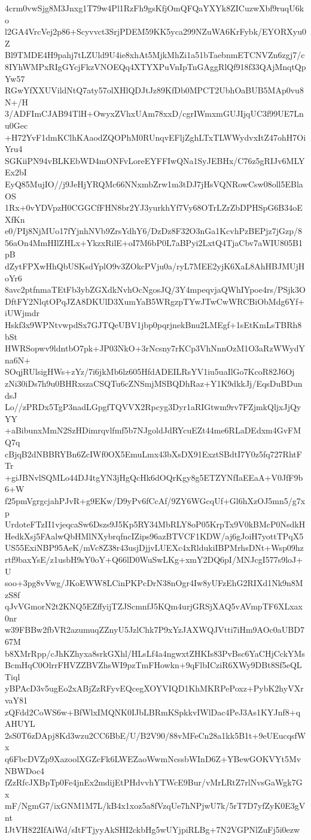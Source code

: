 4crm0vwSjg8M3Jnxg1T79w4Pl1RzFh9gsKfjOmQFQaYXYk8ZICuzwXbf9ruqU6ko
l2GA4VrcVej2p86+Scyvvct3SrjPDEM59KK5yca299NZuWA6KrFybk/EYORXyu0Z
Bl9TMDE4H9pahj7tLZUld9U4ie8xhAt5MjkMhZi1a51bTaebnmETCNVZn6zgj7/c
8IYhWMPxRIgGYcjFkzVNOEQq4XTYXPuVnIpTnGAggRlQf918f33QAjMnqtQpYw57
RGwYfXXUVildNtQ7aty57olXHlQDJtJz89KfDb0MPCT2UbhOaBUB5MAp0vu8N+/H
3/ADFImCJAB94TlH+OwyxZVhxUAm78xxD/cgrIWmxmGUJIjqUC3f99UE7Lnu0Gec
+H72YvF1dmKClhKAaodZQOPhM0RUnqvEFljZghLTxTLWWydvxItZ47ohH7OiYru4
SGKiiPN94vBLKEbWD4mONFvLoreEYFFIwQNa1SyJEBHx/C76z5gRIJv6MLYEx2bI
EyQ85MujIO//j9JeHjYRQMc66NNxmbZrw1m3tDJ7jHsVQNRowCsw08oll5EBlaOS
1Rx+0vYDVpzH0CGGCfFHN8br2YJ3yurkhYf7Vy68OTrLZrZbDPHSpG6B34oEXfKn
e0/PIj8NjMUo17fYjnhNVb9ZrsYdhY6/DzDz8F32O3nGa1KcvhPzBEPjz7jGzp/8
56aOn4MmHIlZHLx+YkzxRilE+oI7M6bP0L7aBPyi2LxtQ4TjaCbv7aWIU805B1pB
dZytFPXwHhQbUSKsdYplO9v3ZOkcPVju0a/ryL7MEE2yjK6XaL8AhHBJMUjHoYr6
8avc2ptfnmaTEtFb3ybZGXdkNvhOcNgosJQ/3Y4mpeqvjaQWhIYpoe4rs/PSjk3O
DftFY2NlqtOPqJZA8DKUlD3XumYaB5WRgzpTYwJTwCwWRCBiObMdg6Yf+iUWjmdr
Hskf3x9WPNtvwpdSx7GJTQeUBV1jbp0pqrjnekBnu2LMEgf+1sEtKmLsTBRh8bSt
HWRSopwv9ldntbO7pk+JP03NkO+3rNcsny7rKCp3VhNnnOzM1O3aRzWWydYna6N+
SOqjRUlsigHWs+zYz/7i6jkMb6lz605HfdADEILRsYV1iu5uaIlGo7KcoR82J6Oj
zNi30iDs7h9u0BHRxszaCSQTu6cZNSmjMSBQDhRaz+Y1K9dkkJj/EqsDuBDundsJ
Lo//zPRDx5TgP3nadLGpgfTQVVX2Rpcyg3Dyr1aRIGtwm9rv7FZjmkQljxJjQyYY
+aBibunxMmN2SzHDimrqvlfmf5b7NJgoldJdRYcuEZt44me6RLaDEdxm4GvFMQ7q
cBjqB2dNBBRYBn6ZcIWf0OX5EmuLmx43bXsDX91ExztSBdtI7Y0z5fq727RhtFTr
+giJBNvlSQMLo44DJ4tgYN3jHgQcHk6dOQrKgy8g5ETZYNfIaEEaA+V0JfF9b6+W
f25pmVgrgcjahPJvR+g9EKw/D9yPv6fCcAf/9ZY6WGcqUf+Gl6hXzOJ5mn5/g7xp
UrdoteFTzII1vjeqcaSw6Dszs9J5Kp5RY34MbRLY8oP05KrpTx9V0kBMcP0NsdkH
HedkXsj5FAalwQbHMlNXybrqfncIZips96azBTVCF1KDW/aj6gJoiH7yottTPqX5
US55ExiNBP95AeK/mVc8Z38r43usjDjjvLUEXc4xRldukiIBPMrhsDNt+Wsp09hz
rtf9baxYsE/z1usbH9sY0oY+Q66lD0WuSwLKg+xmY2DQ6pI/MNJcgI577s9loJ+U
soo+3pg8vVwg/JKoEWW8LCinPKPcDrN38nOgr4Iw8yUFzEhG2RIXd1Nk9n8MzS8f
qJvVGmorN2t2KNQ5EZffyijTZJScmnfJ5KQm4urjGRSjXAQ5vAVmpTF6XLxax0nr
w39FBBw2fbVR2azumuqZZnyU5JzlChk7P9xYzJAXWQJVtti7iHm9AOc0aUBD767M
b8XMrRpp/cJhKZhyxa8srkGXhl/HLsLf4a4ngwxtZHKIs83PvBsc6YaCHjCckYMs
BcmHqC0OlrrFHVZZBVZhsWI9pzTmFHowkn+9qFlbICziR6XWy9DBt8Sf5eQLTiql
yBPAcD3v5ugEo2xABjZzRFyvEQcegXOYVIQD1KhMKRPePoxz+PybK2hyVXrvaY81
zQFdd2CoWS6w+BfWlxIMQNK0IJbLBRmKSpkkvIWlDac4PeJ3As1KYJnf8+qAHUYL
2sS0T6zDApj8Kd3wzu2CC6BbE/U/B2V90/88vMFeCn28a1kk5B1t+9eUEucqsfWx
q6FbcDVZp9XazoolXGZcFk6LWEZaoWwmNcssbWInD6Z+YBewGOKVYt5MvNBWDoc4
fZzRfcJXBpTp0Fe4jnEx2mdijEtPHdvvhYTWcE9Bur/vMrLRtZ7rlNvsGaWgk7Gx
mF/NgmG7/ixGNM1M7L/kB4x1xoz5a8fVzqUe7hNPjwU7k/5rT7D7yfZyK0E3gVnt
IJtVH822IfAiWd/sItFTjyyAkSHI2ckbHg5wUYjpiRLBg+7N2VGPNlZuFj5i0ezw
